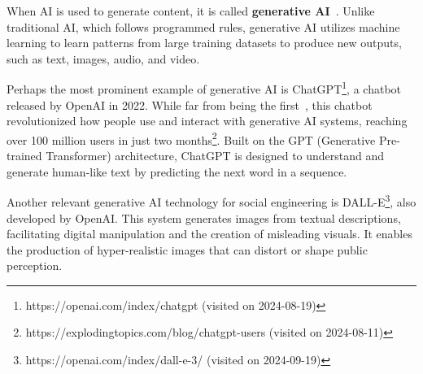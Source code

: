 When AI is used to generate content, it is called \textbf{generative AI}~\citep{goodfellow_Generative_Adversarial_Networks_2020}. Unlike traditional AI, which follows programmed rules, generative AI utilizes machine learning to learn patterns from large training datasets to produce new outputs, such as text, images, audio, and video.

Perhaps the most prominent example of generative AI is ChatGPT\footnote{https://openai.com/index/chatgpt (visited on 2024-08-19)}, a chatbot released by OpenAI in 2022. While far from being the first~\citep{weizenbaum_ELIZA_1996}, this chatbot revolutionized how people use and interact with generative AI systems, reaching over 100 million users in just two months\footnote{https://explodingtopics.com/blog/chatgpt-users (visited on 2024-08-11)}. Built on the GPT (Generative Pre-trained Transformer) architecture, ChatGPT is designed to understand and generate human-like text by predicting the next word in a sequence.

Another relevant generative AI technology for social engineering is DALL-E\footnote{https://openai.com/index/dall-e-3/ (visited on 2024-09-19)}, also developed by OpenAI. This system generates images from textual descriptions, facilitating digital manipulation and the creation of misleading visuals. It enables the production of hyper-realistic images that can distort or shape public perception.
